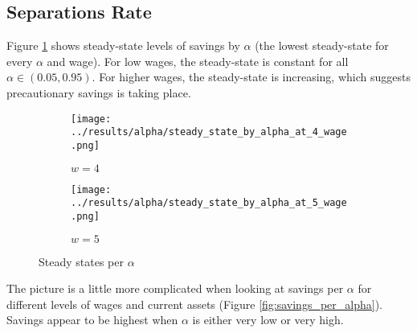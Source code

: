 \documentclass[12pt]{article}
\begin{document}
\subsection{Separations Rate}

Figure \ref{fig:steady_state_by_alpha} shows steady-state levels of savings by $\alpha$ (the lowest steady-state for every $\alpha$ and wage). For low wages, the steady-state is constant for all $\alpha \in (0.05, 0.95)$. For higher wages, the steady-state is increasing, which suggests precautionary savings is taking place.

\begin{figure}[hbt!]

\begin{subfigure}{0.5\textwidth}
\texttt{[image: ../results/alpha/steady\_state\_by\_alpha\_at\_4\_wage.png]} \caption{$w=4$}
\end{subfigure}%
\begin{subfigure}{0.5\textwidth}
\texttt{[image: ../results/alpha/steady\_state\_by\_alpha\_at\_5\_wage.png]}
\caption{$w=5$}
\end{subfigure}

\caption{Steady states per $\alpha$}
\label{fig:steady_state_by_alpha}
\end{figure}


The picture is a little more complicated when looking at savings per $\alpha$ for different levels of wages and current assets (Figure \ref{fig:savings_per_alpha}). Savings appear to be highest when $\alpha$ is either very low or very high.
\end{document}
